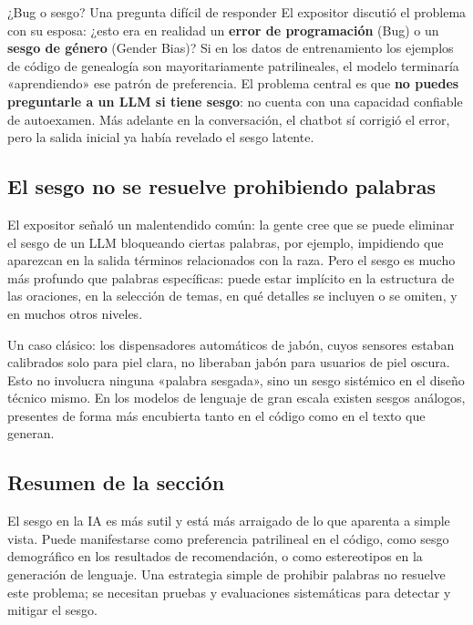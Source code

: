 \documentclass[a4paper]{article}
\begin{document}
\begin{warningbox}{¿Bug o sesgo? Una pregunta difícil de responder}
El expositor discutió el problema con su esposa: ¿esto era en realidad un \textbf{error de programación} (Bug) o un \textbf{sesgo de género} (Gender Bias)? Si en los datos de entrenamiento los ejemplos de código de genealogía son mayoritariamente patrilineales, el modelo terminaría «aprendiendo» ese patrón de preferencia. El problema central es que \textbf{no puedes preguntarle a un LLM si tiene sesgo}: no cuenta con una capacidad confiable de autoexamen. Más adelante en la conversación, el chatbot sí corrigió el error, pero la salida inicial ya había revelado el sesgo latente.
\end{warningbox}

\subsection{El sesgo no se resuelve prohibiendo palabras}

El expositor señaló un malentendido común: la gente cree que se puede eliminar el sesgo de un LLM bloqueando ciertas palabras, por ejemplo, impidiendo que aparezcan en la salida términos relacionados con la raza. Pero el sesgo es mucho más profundo que palabras específicas: puede estar implícito en la estructura de las oraciones, en la selección de temas, en qué detalles se incluyen o se omiten, y en muchos otros niveles.

Un caso clásico: los dispensadores automáticos de jabón, cuyos sensores estaban calibrados solo para piel clara, no liberaban jabón para usuarios de piel oscura. Esto no involucra ninguna «palabra sesgada», sino un sesgo sistémico en el diseño técnico mismo. En los modelos de lenguaje de gran escala existen sesgos análogos, presentes de forma más encubierta tanto en el código como en el texto que generan.

\subsection{Resumen de la sección}

El sesgo en la IA es más sutil y está más arraigado de lo que aparenta a simple vista. Puede manifestarse como preferencia patrilineal en el código, como sesgo demográfico en los resultados de recomendación, o como estereotipos en la generación de lenguaje. Una estrategia simple de prohibir palabras no resuelve este problema; se necesitan pruebas y evaluaciones sistemáticas para detectar y mitigar el sesgo.
\end{document}
